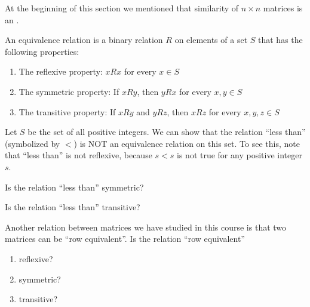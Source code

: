 \documentclass{ximera}
\begin{document}
\begin{problem}
At the beginning of this section we mentioned that similarity of $n \times n$ matrices is an .

An equivalence relation is a binary relation $R$ on elements of a set $S$ that has the following properties:
\begin{enumerate}
\item The reflexive property:  $x R x$ for every $x \in S$
\item The symmetric property:  If $x R y$, then $y R x$ for every $x,y \in S$
\item The transitive property:  If $x R y$ and $y R z$, then $x R z$ for every $x,y,z \in S$
\end{enumerate}

Let $S$ be the set of all positive integers.  We can show that the relation ``less than'' (symbolized by $<$) is NOT an equivalence relation on this set.  To see this, note that ``less than'' is not reflexive, because $s<s$ is not true for any positive integer $s$.

\begin{problem}\label{prob:lessthan1}
Is the relation ``less than'' symmetric?
\end{problem}

\begin{problem}\label{prob:lessthan2}
Is the relation ``less than'' transitive?
\end{problem}

\begin{problem}\label{prob:lessthan3}
Another relation between matrices we have studied in this course is that two matrices can be ``row equivalent''.  Is the relation ``row equivalent'' 
\begin{enumerate}
    \item reflexive? 
    \item symmetric? 
    \item transitive? 
\end{enumerate}

\end{problem}

\end{problem}
\end{document}
